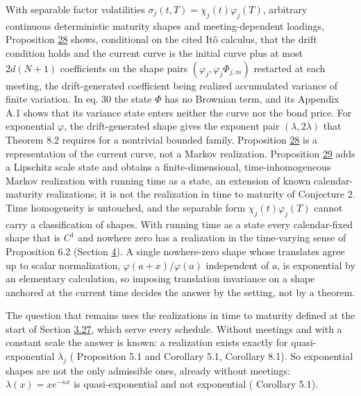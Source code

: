 \documentclass[11pt]{article}
\begin{document}
With separable factor volatilities \(\sigma_j(t,T)=\chi_j(t)\varphi_j(T)\), arbitrary continuous deterministic maturity shapes and meeting-dependent loadings, Proposition \hyperref[res:Proposition-28]{28} shows, conditional on the cited Itô calculus, that the drift condition holds and the current curve is the initial curve plus at most \(2d(N+1)\) coefficients on the shape pairs \((\varphi_j,\varphi_j\Phi_{j,m})\) restarted at each meeting, the drift-generated coefficient being realized accumulated variance of finite variation. In \cite{brace2024sofr} eq. 30 the state \(\Phi\) has no Brownian term, and its Appendix A.1 shows that its variance state enters neither the curve nor the bond price. For exponential \(\varphi\), the drift-generated shape gives the exponent pair \((\lambda,2\lambda)\) that \cite{filipovic2000exponential} Theorem 8.2 requires for a nontrivial bounded family. Proposition \hyperref[res:Proposition-28]{28} is a representation of the current curve, not a Markov realization. Proposition \hyperref[res:Proposition-29]{29} adds a Lipschitz scale state and obtains a finite-dimensional, time-inhomogeneous Markov realization with running time as a state, an extension of known calendar-maturity realizations; it is not the realization in time to maturity of Conjecture 2. Time homogeneity is untouched, and the separable form \(\chi_j(t)\varphi_j(T)\) cannot carry a classification of shapes. With running time as a state every calendar-fixed shape that is \(C^1\) and nowhere zero has a realization in the time-varying sense of \cite{bjork2001existence} Proposition 6.2 (Section \hyperref[sec:4]{4}). A single nowhere-zero shape whose translates agree up to scalar normalization, \(\varphi(a+x)/\varphi(a)\) independent of \(a\), is exponential by an elementary calculation, so imposing translation invariance on a shape anchored at the current time decides the answer by the setting, not by a theorem.

The question that remains uses the realizations in time to maturity defined at the start of Section \hyperref[sec:3.27]{3.27}, which serve every schedule. Without meetings and with a constant scale the answer is known: a realization exists exactly for quasi-exponential \(\lambda_j\) (\cite{bjork2001existence} Proposition 5.1 and Corollary 5.1, \cite{tappe2010alternative} Corollary 8.1). So exponential shapes are not the only admissible ones, already without meetings: \(\lambda(x)=xe^{-\kappa x}\) is quasi-exponential and not exponential (\cite{bjork2001existence} Corollary 5.1).
\end{document}
